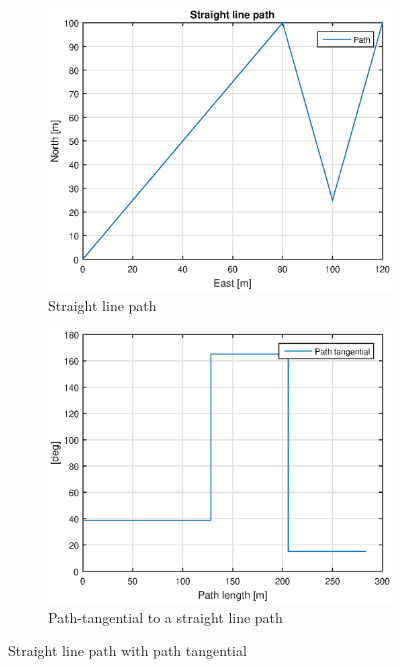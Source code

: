\begin{figure}[H]
\centering
\begin{subfigure}{0.49\textwidth}
		\includegraphics[width=\textwidth]{figs/TheoryPlot/StraightLine.eps}
\caption{Straight line path}
\label{Fig:StraightLinePath}
\end{subfigure}
\begin{subfigure}{0.49\textwidth}
		\includegraphics[width=\textwidth]{figs/TheoryPlot/TangentialStraight.eps}
		\caption{Path-tangential to a straight line path}
		\label{Fig:Path-tangential}
\end{subfigure}
\caption{Straight line path with path tangential}
\label{Fig:StraightLine}
\end{figure}

